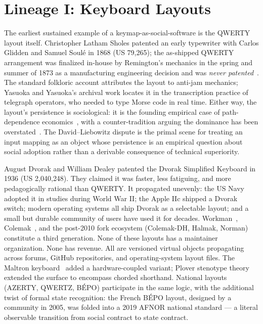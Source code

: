 \documentclass[10pt,letterpaper,twocolumn]{article}
\begin{document}
\section{Lineage I: Keyboard Layouts}
\label{sec:lineage1}

The earliest sustained example of a keymap-as-social-software is the QWERTY layout itself. Christopher Latham Sholes patented an early typewriter with Carlos Glidden and Samuel Soulé in 1868 (US 79{,}265); the as-shipped QWERTY arrangement was finalized in-house by Remington's mechanics in the spring and summer of 1873 as a manufacturing engineering decision and was \emph{never patented}~\citep{yasuoka2011prehistory}. The standard folkloric account attributes the layout to anti-jam mechanics; Yasuoka and Yasuoka's archival work locates it in the transcription practice of telegraph operators, who needed to type Morse code in real time. Either way, the layout's persistence is sociological: it is the founding empirical case of path-dependence economics~\citep{david1985qwerty,arthur1989competing}, with a counter-tradition arguing the dominance has been overstated~\citep{liebowitz1990fable}. The David--Liebowitz dispute is the primal scene for treating an input mapping as an object whose persistence is an empirical question about social adoption rather than a derivable consequence of technical superiority.

August Dvorak and William Dealey patented the Dvorak Simplified Keyboard in 1936 (US 2{,}040{,}248). They claimed it was faster, less fatiguing, and more pedagogically rational than QWERTY. It propagated unevenly: the US Navy adopted it in studies during World War II; the Apple IIc shipped a Dvorak switch; modern operating systems all ship Dvorak as a selectable layout; and a small but durable community of users have used it for decades. Workman~\citep{bucao2010workman}, Colemak~\citep{coleman2006colemak}, and the post-2010 fork ecosystem (Colemak-DH, Halmak, Norman) constitute a third generation. None of these layouts has a maintainer organization. None has revenue. All are versioned virtual objects propagating across forums, GitHub repositories, and operating-system layout files. The Maltron keyboard~\citep{malt1977keyboard} added a hardware-coupled variant; Plover stenotype theory~\citep{knight2010plover} extended the surface to encompass chorded shorthand. National layouts (AZERTY, QWERTZ, BÉPO) participate in the same logic, with the additional twist of formal state recognition: the French BÉPO layout, designed by a community in 2005, was folded into a 2019 AFNOR national standard --- a literal observable transition from social contract to state contract.
\end{document}
